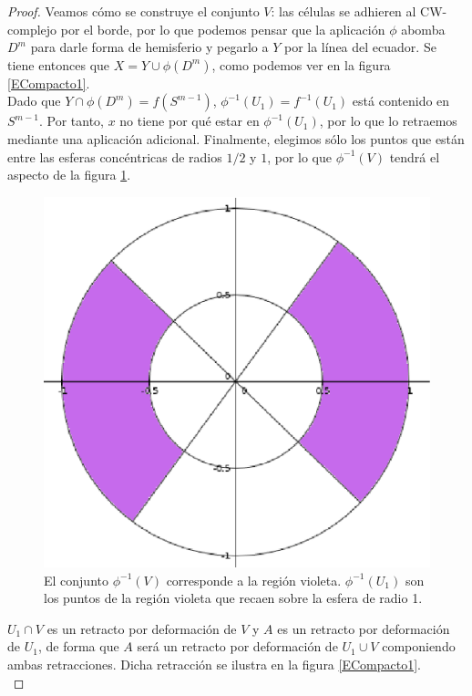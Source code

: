 \begin{proof}
Veamos cómo se construye el conjunto $V$: las células se adhieren al CW-complejo por el borde, por lo que podemos pensar que la aplicación $\phi$ abomba $D^m$ para darle forma de hemisferio y pegarlo a $Y$ por la línea del ecuador. Se tiene entonces que $X=Y\cup \phi(D^m)$, como podemos ver en la figura \ref{ECompacto1}. 
\\

Dado que $Y\cap \phi(D^m)=f(S^{m-1})$, $\phi^{-1}(U_1)=f^{-1}(U_1)$ está contenido en $S^{m-1}$. Por tanto, $x$ no tiene por qué estar en $\phi^{-1}(U_1)$, por lo que lo retraemos mediante una aplicación adicional. Finalmente, elegimos sólo los puntos que están entre las esferas concéntricas de radios $1/2$ y $1$, por lo que $\phi^{-1}(V)$ tendrá el aspecto de la figura \ref{PhiMenos1V}.
\\

\begin{figure}[h]
\centering
\includegraphics[scale=0.4]{Figures/PhiMenos1V}
\caption{\label{PhiMenos1V} El conjunto $\phi^{-1}(V)$ corresponde a la región violeta. $\phi^{-1}(U_1)$ son los puntos de la región violeta que recaen sobre la esfera de radio 1.}
\end{figure}

$U_1 \cap V$ es un retracto por deformación de $V$ y $A$ es un retracto por deformación de $U_1$, de forma que $A$ será un retracto por deformación de $U_1 \cup V$ componiendo ambas retracciones. Dicha retracción se ilustra en la figura \ref{ECompacto1}.
\\


\end{proof}
